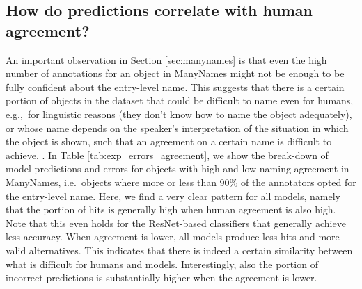 \subsection{How do predictions correlate with human agreement?}

An important observation in Section \ref{sec:manynames} is that even the high number of annotations for an object in ManyNames might not be enough to be fully confident about the entry-level name.
This suggests that there is a certain portion of objects in the dataset that could be difficult to name even for humans, e.g.,~for linguistic reasons (they don't know how to name the object adequately), or whose name depends on the speaker's interpretation of the situation in which the object is shown, such that an agreement on a certain name is difficult to achieve. .
In Table \ref{tab:exp_errors_agreement}, we show the break-down of model predictions and errors for objects with high and low naming agreement in ManyNames, i.e.\ objects where more or less than 90\% of the annotators opted for the entry-level name. 
Here, we find a very clear pattern for all models, namely that the portion of hits is generally high when human agreement is also high.
Note that this even holds for the ResNet-based classifiers that generally achieve less accuracy.
When agreement is lower, all models produce less hits and more valid alternatives. 
This indicates that there is indeed a certain similarity between what is difficult for humans and models.
Interestingly, also the portion of incorrect predictions is substantially higher when the agreement is lower. 












